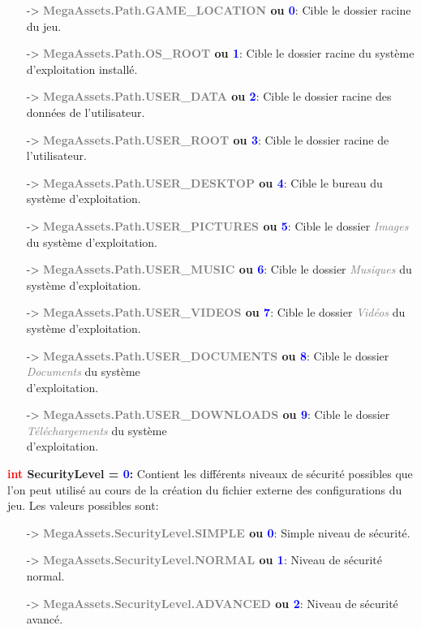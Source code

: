 \documentclass[a4paper, 11pt]{article}
\begin{document}
	\begin{itemize}
		\item[-> \textbf{\textcolor{gray}{MegaAssets.Path.GAME\_LOCATION} ou \textcolor{blue}{0}}:] Cible le 
		dossier racine du jeu.
		\item[-> \textbf{\textcolor{gray}{MegaAssets.Path.OS\_ROOT} ou \textcolor{blue}{1}}:] Cible le 
		dossier racine du système d'exploitation installé.
		\item[-> \textbf{\textcolor{gray}{MegaAssets.Path.USER\_DATA} ou \textcolor{blue}{2}}:] Cible le 
		dossier racine des données de l'utilisateur.
		\item[-> \textbf{\textcolor{gray}{MegaAssets.Path.USER\_ROOT} ou \textcolor{blue}{3}}:] Cible le 
		dossier racine de l'utilisateur.
		\item[-> \textbf{\textcolor{gray}{MegaAssets.Path.USER\_DESKTOP} ou \textcolor{blue}{4}}:] Cible le 
		bureau du système d'exploitation.
		\item[-> \textbf{\textcolor{gray}{MegaAssets.Path.USER\_PICTURES} ou \textcolor{blue}{5}}:] Cible le 
		dossier \textcolor{gray}{\textit{Images}} du système d'exploitation.
		\item[-> \textbf{\textcolor{gray}{MegaAssets.Path.USER\_MUSIC} ou \textcolor{blue}{6}}:] Cible le 
		dossier \textcolor{gray}{\textit{Musiques}} du système d'exploitation.
		\item[-> \textbf{\textcolor{gray}{MegaAssets.Path.USER\_VIDEOS} ou \textcolor{blue}{7}}:] Cible le 
		dossier \textcolor{gray}{\textit{Vidéos}} du système d'exploitation.
		\item[-> \textbf{\textcolor{gray}{MegaAssets.Path.USER\_DOCUMENTS} ou \textcolor{blue}{8}}:] Cible 
		le dossier \textcolor{gray}{\textit{Documents}} du système \\d'exploitation.
		\item[-> \textbf{\textcolor{gray}{MegaAssets.Path.USER\_DOWNLOADS} ou \textcolor{blue}{9}}:] Cible 
		le dossier \textcolor{gray}{\textit{Téléchargements}} du système \\d'exploitation.\\
	\end{itemize}
	\textbf{\textcolor{red}{int} SecurityLevel = \textcolor{blue}{0}:} Contient les différents niveaux de 
	sécurité possibles que l'on peut utilisé au cours de la création du fichier externe des configurations 
	du jeu. Les valeurs possibles sont:
	\begin{itemize}	
		\item [-> \textbf{\textcolor{gray}{MegaAssets.SecurityLevel.SIMPLE} ou \textcolor{blue}{0}}:] Simple 
		niveau de sécurité.
		\item [-> \textbf{\textcolor{gray}{MegaAssets.SecurityLevel.NORMAL} ou \textcolor{blue}{1}}:] Niveau 
		de sécurité normal.
		\item [-> \textbf{\textcolor{gray}{MegaAssets.SecurityLevel.ADVANCED} ou \textcolor{blue}{2}}:] 
		Niveau de sécurité avancé.\\
	\end{itemize}
\end{document}
